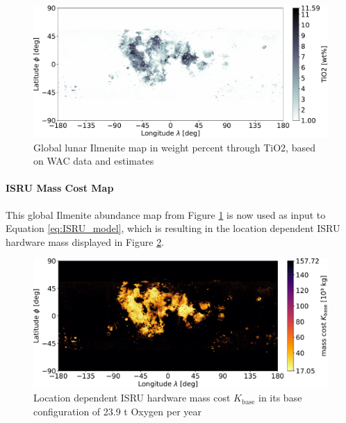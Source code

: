 \documentclass[utf8]{FrontiersinHarvard} %
\begin{document}
\begin{figure}[h!]
\begin{center}
\includegraphics[width=\linewidth]{img/WAC_TIO2_GLOBAL.pdf}
\end{center}
\caption{Global lunar Ilmenite map in weight percent through TiO2, based on WAC data and estimates}
\label{fig:Ilmenite-map}
\end{figure}


\paragraph{ISRU Mass Cost Map}

This global Ilmenite abundance map from Figure \ref{fig:Ilmenite-map} is now used as input to  Equation \ref{eq:ISRU_model}, which is resulting in the location dependent ISRU hardware mass displayed in Figure \ref{fig:A-cost-map}.

\label{sec:ISRU-map}


\begin{figure}[h!]
\begin{center}
\includegraphics[width=\linewidth]{img/ISRU_COST_GLOBAL.pdf}
\end{center}
\caption{Location dependent ISRU hardware mass cost $K_{\mathrm{base}}$ in its base configuration of 23.9 t Oxygen per year}
\label{fig:A-cost-map}
\end{figure}
\end{document}
